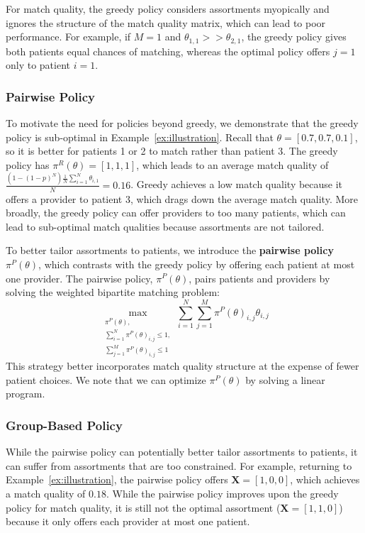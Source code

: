 \documentclass[11pt]{article}
\begin{document}
For match quality, the greedy policy considers assortments myopically and ignores the structure of the match quality matrix, which can lead to poor performance. 
For example, if $M=1$ and $\theta_{1,1} >> \theta_{2,1}$, the greedy policy gives both patients equal chances of matching, whereas the optimal policy offers $j=1$ only to patient $i=1$. 

\subsubsection{Pairwise Policy}
\label{sec:pairwise}
To motivate the need for policies beyond greedy, we demonstrate that the greedy policy is sub-optimal in Example~\ref{ex:illustration}.
Recall that $\theta = [0.7,0.7,0.1]$, so it is better for patients 1 or 2 to match rather than patient 3. 
The greedy policy has $\pi^{R}(\theta)  = [1,1,1]$, which leads to an average match quality of $\frac{(1-(1-p)^{N}) \frac{1}{N} \sum_{i=1}^{N} \theta_{i,1}}{N} = 0.16$. 
Greedy achieves a low match quality because it offers a provider to patient $3$, which drags down the average match quality.
More broadly, the greedy policy can offer providers to too many patients, which can lead to sub-optimal match qualities because assortments are not tailored. 

To better tailor assortments to patients, we introduce the \textbf{pairwise policy} $\pi^{P}(\theta)$, which contrasts with the greedy policy by offering each patient at most one provider. 
The pairwise policy, $\pi^{P}(\theta)$, pairs patients and providers by solving the weighted bipartite matching problem: 
\begin{equation}
\max\limits_{\substack{
\pi^{P}(\theta), \\
\sum_{i=1}^{N} \pi^{P}(\theta)_{i,j} \leq 1, \\
\sum_{j=1}^{M} \pi^{P}(\theta)_{i,j} \leq 1
}} 
\sum_{i=1}^{N} \sum_{j=1}^{M} \pi^{P}(\theta)_{i,j} \theta_{i,j}
\end{equation}
This strategy better incorporates match quality structure at the expense of fewer patient choices. 
We note that we can optimize $\pi^{P}(\theta)$ by solving a linear program. 

\subsubsection{Group-Based Policy}
\label{sec:grouping}
While the pairwise policy can potentially better tailor assortments to patients, it can suffer from assortments that are too constrained. 
For example, returning to Example~\ref{ex:illustration}, the pairwise policy offers $\mathbf{X} = [1,0,0]$, which achieves a match quality of $0.18$. 
While the pairwise policy improves upon the greedy policy for match quality, it is still not the optimal assortment ($\mathbf{X} = [1,1,0]$) because it only offers each provider at most one patient. 
\end{document}

